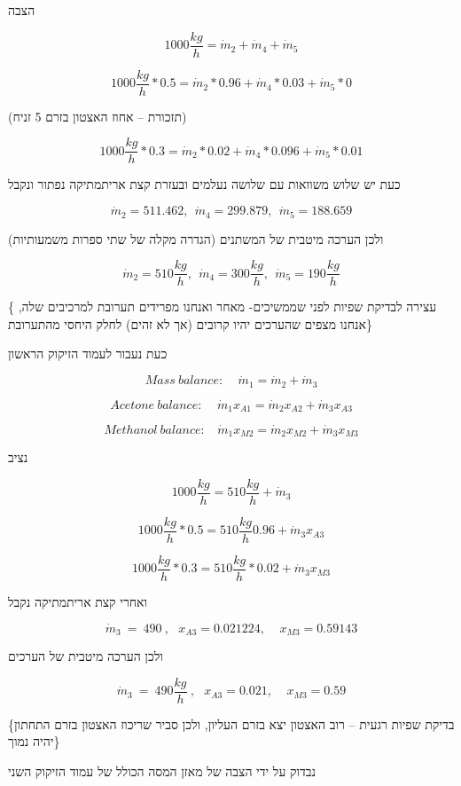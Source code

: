 \documentclass[
  hebrew,
  letterpaper,
  DIV=11,
  numbers=noendperiod]{scrreprt}
\begin{document}
הצבה

\[1000\frac{kg}{h} = {\dot{m}}_{2} + {\dot{m}}_{4} + {\dot{m}}_{5}\]

\[1000\frac{kg}{h}*0.5 = {\dot{m}}_{2}*0.96 + {\dot{m}}_{4}*0.03 + {\dot{m}}_{5}*0\]

(תזכורת -- אחוז האצטון בזרם 5 זניח)

\[1000\frac{kg}{h}*0.3 = {\dot{m}}_{2}*0.02 + {\dot{m}}_{4}*0.096 + {\dot{m}}_{5}*0.01\]

כעת יש שלוש משוואות עם שלושה נעלמים ובעזרת קצת אריתמתיקה נפתור ונקבל

\[{\dot{m}}_{2} = 511.462,\ \ {\dot{m}}_{4} = 299.879,\ \ {\dot{m}}_{5} = 188.659\]

ולכן הערכה מיטבית של המשתנים (הגדרה מקלה של שתי ספרות משמעותיות)

\[{\dot{m}}_{2} = 510\frac{kg}{h},\ \ {\dot{m}}_{4} = 300\frac{kg}{h},\ \ {\dot{m}}_{5} = 190\frac{kg}{h}\]

\{ עצירה לבדיקת שפיות לפני שממשיכים- מאחר ואנחנו מפרידים תערובת למרכיבים
שלה, אנחנו מצפים שהערכים יהיו קרובים (אך לא זהים) לחלק היחסי מהתערובת\}

כעת נעבור לעמוד הזיקוק הראשון

\[Mass\ balance:\ \ \ \ \ {\dot{m}}_{1} = {\dot{m}}_{2} + {\dot{m}}_{3}\]

\[Acetone\ balance:\ \ \ \ \ {\dot{m}}_{1}x_{A1} = {\dot{m}}_{2}x_{A2} + {\dot{m}}_{3}x_{A3}\]

\[Methanol\ balance:\ \ \ \ {\dot{m}}_{1}x_{M2} = {\dot{m}}_{2}x_{M2} + {\dot{m}}_{3}x_{M3}\]

נציב

\[1000\frac{kg}{h} = 510\frac{kg}{h} + {\dot{m}}_{3}\]

\[1000\frac{kg}{h}*0.5 = 510\frac{kg}{h}0.96 + {\dot{m}}_{3}x_{A3}\]

\[1000\frac{kg}{h}*0.3 = 510\frac{kg}{h}*0.02 + {\dot{m}}_{3}x_{M3}\]

ואחרי קצת אריתמתיקה נקבל

\[{\dot{m}}_{3}\  = \ 490\ ,\ \ \ x_{A3} = 0.021224,\ \ \ \ \ x_{M3} = 0.59143\]

ולכן הערכה מיטבית של הערכים

\[{\dot{m}}_{3}\  = \ 490\frac{kg}{h}\ ,\ \ \ x_{A3} = 0.021,\ \ \ \ \ x_{M3} = 0.59\]

\{בדיקת שפיות רגעית -- רוב האצטון יצא בזרם העליון, ולכן סביר שריכוז
האצטון בזרם התחתון יהיה נמוך\}

נבדוק על ידי הצבה של מאזן המסה הכולל של עמוד הזיקוק השני
\end{document}
